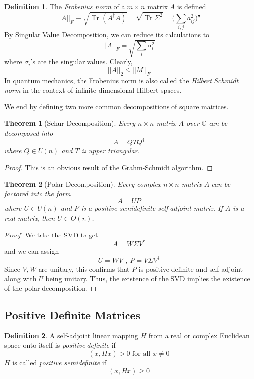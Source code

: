 \documentclass{article}
\DeclareMathOperator{\Tr}{Tr}
\newtheorem{theorem}{Theorem}[section]
\theoremstyle{remark}
\theoremstyle{definition}
\newtheorem{definition}{Definition}[section]
\begin{document}
    \begin{definition}
    The \textit{Frobenius norm} of a $m \times n$ matrix $A$ is defined
    \[||A||_F \equiv \sqrt{\Tr{(A^\dagger A)}} = \sqrt{\Tr{\Sigma^2}} = \bigg( \sum_{i, j} a_{i j}^2 \bigg)^{\frac{1}{2}} \]
    By Singular Value Decomposition, we can reduce its calculations to
    \[ ||A||_F = \sqrt{\sum_i \sigma_i^2}\]
    where $\sigma_i$'s are the singular values. Clearly, 
    \[||A||_2 \leq ||M||_F\]
    In quantum mechanics, the Frobenius norm is also called the \textit{Hilbert Schmidt norm} in the context of infinite dimensional Hilbert spaces. 
    \end{definition}

    We end by defining two more common decompositions of square matrices. 

    \begin{theorem}[Schur Decomposition]
    Every $n \times n$ matrix $A$ over $\mathbb{C}$ can be decomposed into
    \[A = Q T Q^\dagger\]
    where $Q \in U(n)$ and $T$ is upper triangular. 
    \end{theorem}
    \begin{proof}
    This is an obvious result of the Grahm-Schmidt algorithm. 
    \end{proof}

    \begin{theorem}[Polar Decomposition]
    Every complex $n \times n$ matrix $A$ can be factored into the form
    \[A = U P\]
    where $U \in U(n)$ and $P$ is a positive semidefinite self-adjoint matrix. If $A$ is a real matrix, then $U \in O(n)$. 
    \end{theorem}
    \begin{proof}
    We take the SVD to get 
    \[A = W \Sigma V^\dagger\]
    and we can assign 
    \[U = W V^\dagger, \; P = V \Sigma V^\dagger\]
    Since $V, W$ are unitary, this confirms that $P$ is positive definite and self-adjoint along with $U$ being unitary. Thus, the existence of the SVD implies the existence of the polar decomposition. 
    \end{proof}

  \subsection{Positive Definite Matrices}

    \begin{definition}
    A self-adjoint linear mapping $H$ from a real or complex Euclidean space onto itself is \textit{positive definite} if 
    \[(x, H x) > 0 \text{ for all } x \neq 0\]
    $H$ is called \textit{positive semidefinite} if 
    \[(x, H x) \geq 0\]
    \end{definition}
\end{document}
